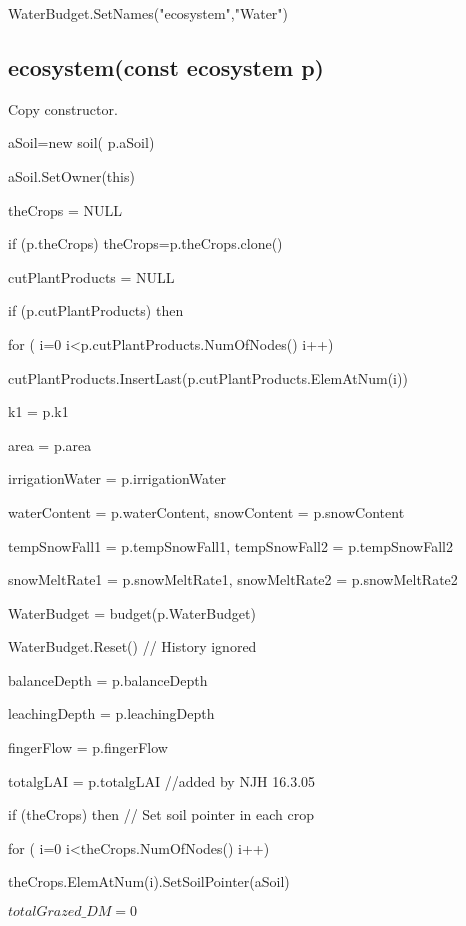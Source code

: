 \documentclass[%
]{scrartcl}
\begin{document}
   WaterBudget.SetNames("ecosystem","Water")


\subsection{ecosystem(const ecosystem p)}
Copy constructor.

 	aSoil=new soil(  p.aSoil)
   
   aSoil.SetOwner(this)
  
   theCrops = NULL
  
   if (p.theCrops)  theCrops=p.theCrops.clone()
   
   cutPlantProducts = NULL
  
   if (p.cutPlantProducts) then

   \quad  	for ( i=0 i<p.cutPlantProducts.NumOfNodes() i++)
      	
\quad  \quad   cutPlantProducts.InsertLast(p.cutPlantProducts.ElemAtNum(i))
  
   k1                  = p.k1

   area                = p.area

   irrigationWater     = p.irrigationWater

   waterContent        = p.waterContent,
   snowContent         = p.snowContent

   tempSnowFall1       = p.tempSnowFall1,
   tempSnowFall2       = p.tempSnowFall2

   snowMeltRate1       = p.snowMeltRate1,
   snowMeltRate2       = p.snowMeltRate2

   WaterBudget         = budget(p.WaterBudget)

   WaterBudget.Reset()   // History ignored

   balanceDepth        = p.balanceDepth

   leachingDepth       = p.leachingDepth

   fingerFlow          = p.fingerFlow

   totalgLAI	  = p.totalgLAI    //added by NJH 16.3.05


   if (theCrops) then // Set soil pointer in each crop
   	
\quad  for ( i=0 i<theCrops.NumOfNodes() i++)
	   	
\quad  \quad   theCrops.ElemAtNum(i).SetSoilPointer(aSoil)

	$totalGrazed\_DM				= 0$


%
\end{document}
